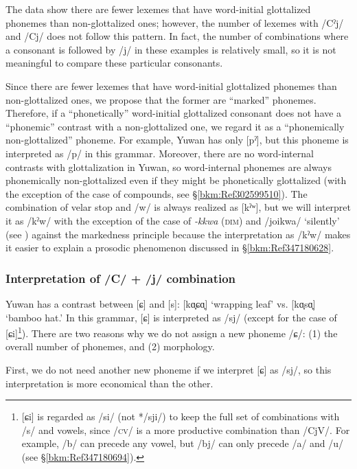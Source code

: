 The data show there are fewer lexemes that have word-initial glottalized phonemes than non-glottalized ones; however, the number of lexemes with /Cˀj/ and /Cj/ does not follow this pattern. In fact, the number of combinations where a consonant is followed by /j/ in these examples is relatively small, so it is not meaningful to compare these particular consonants.

Since there are fewer lexemes that have word-initial glottalized phonemes than non-glottalized ones, we propose that the former are “marked” phonemes. Therefore, if a “phonetically” word-initial glottalized consonant does not have a “phonemic” contrast with a non-glottalized one, we regard it as a “phonemically non-glottalized” phoneme. For example, Yuwan has only [pˀ], but this phoneme is interpreted as /p/ in this grammar. Moreover, there are no word-internal contrasts with glottalization in Yuwan, so word-internal phonemes are always phonemically non-glottalized even if they might be phonetically glottalized (with the exception of the case of compounds, see §\ref{bkm:Ref302599510}). The combination of velar stop and /w/ is always realized as [kˀʷ], but we will interpret it as /kˀw/ with the exception of the case of \textit{{}-kkwa} (\textsc{dim}) and /joikwa/ ‘silently’ (see ) against the markedness principle because the interpretation as /kˀw/ makes it easier to explain a prosodic phenomenon discussed in §\ref{bkm:Ref347180628}.

\subsubsection{Interpretation of /C/ + /j/ combination}
\label{bkm:Ref347180720}\hypertarget{RefHeadingToc395696975}{}
Yuwan has a contrast between [ɕ] and [s]: [kɑ̟ɕɑ̟] ‘wrapping leaf’ vs. [kɑ̟sɑ̟] ‘bamboo hat.’ In this grammar, [ɕ] is interpreted as /sj/ (except for the case of [ɕi]\footnote{[ɕi] is regarded as /si/ (not */sji/) to keep the full set of combinations with /s/ and vowels, since /\textsc{cv}/ is a more productive combination than /CjV/. For example, /b/ can precede any vowel, but /bj/ can only precede /a/ and /u/ (see §\ref{bkm:Ref347180694}).}). There are two reasons why we do not assign a new phoneme /ɕ/: (1) the overall number of phonemes, and (2) morphology.

First, we do not need another new phoneme if we interpret [ɕ] as /sj/, so this interpretation is more economical than the other.

